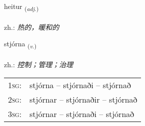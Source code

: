 \documentclass[frontgrid, backgrid]{flacards}\usepackage[]{graphicx}\usepackage[]{xcolor}
\begin{document}
\renewcommand{\flhead}{\vskip5pt \fboxsep=0pt {\small\bfseries\footnotesize Lýsingarorð | 形容词}}
\renewcommand{\fcfoot}{\vskip5pt \fboxsep=0pt \hspace{2pt}{\small\bfseries\footnotesize 1K}}

\renewcommand{\blhead}{\vskip5pt {\small\bfseries\footnotesize Lýsingarorð | 形容词 }}
\renewcommand{\bcfoot}{\vskip5pt \hspace{2pt}{\small\bfseries\footnotesize 1K}}


{heitur \small{\textsubscript{(\textit{adj.})}} \\[1ex] %
\textphonetic{[heiːtʏr]} \\
zh.: \emph{热的，暖和的} \\  [2ex]
\renewcommand*{\arraystretch}{0.8}
}

\renewcommand{\flhead}{\vskip5pt \fboxsep=0pt {\small\bfseries\footnotesize Sagnorð | 动词}}
\renewcommand{\fcfoot}{\vskip5pt \fboxsep=0pt \hspace{2pt}{\small\bfseries\footnotesize 1K}}

\renewcommand{\blhead}{\vskip5pt {\small\bfseries\footnotesize Sagnorð | 动词 }}
\renewcommand{\bcfoot}{\vskip5pt \hspace{2pt}{\small\bfseries\footnotesize 1K}}


{stjórna \small{\textsubscript{(\textit{v.})}} \\[1ex] %
\textphonetic{[stjourtna]} \\
zh.: \emph{控制；管理；治理} \\  [2ex]
\renewcommand*{\arraystretch}{0.8}
\begin{tabular}{p{1cm}l}
\textsc{1sg}: & stjórna -- stjórnaði -- stjórnað \\ 
\textsc{2sg}: & stjórnar -- stjórnaðir -- stjórnað \\ 
\textsc{3sg}: & stjórnar -- stjórnaði -- stjórnað \\ 
\end{tabular}
}
\end{document}
